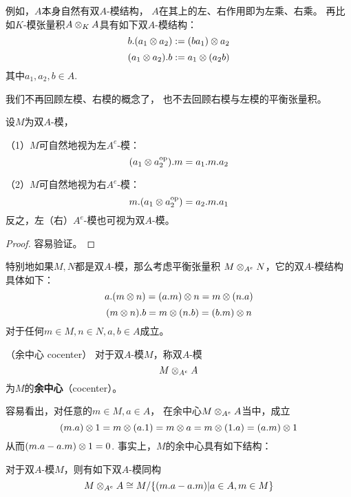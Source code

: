 例如，$A$本身自然有双$A$-模结构，
$A$在其上的左、右作用即为左乘、右乘。
再比如$K$-模张量积$A\otimes_KA$具有如下双$A$-模结构：
$$b.(a_1\otimes a_2):=(ba_1)\otimes a_2$$
$$(a_1\otimes a_2).b:=a_1\otimes(a_2b)$$
其中$a_1,a_2,b\in A$.

我们不再回顾左模、右模的概念了，
也不去回顾右模与左模的平衡张量积。

\begin{prop}设$M$为双$A$-模，

（1）$M$可自然地视为左$A^e$-模：
$$(a_1\otimes a_2^{\text{op}}).m=a_1.m.a_2$$

（2）$M$可自然地视为右$A^e$-模：
$$m.(a_1\otimes a_2^{\text{op}})=a_2.m.a_1$$
反之，左（右）$A^e$-模也可视为双$A$-模。
\end{prop}

\begin{proof}
容易验证。
\end{proof}

特别地如果$M,N$都是双$A$-模，那么考虑平衡张量积
$M\otimes_{A^e}N$，它的双$A$-模结构具体如下：
$$a.(m\otimes n)=(a.m)\otimes n=m\otimes(n.a)$$
$$(m\otimes n).b=m\otimes (n.b)=(b.m)\otimes n$$
对于任何$m\in M,n\in N,a,b\in A$成立。

\begin{definition}（余中心 cocenter）
对于双$A$-模$M$，称双$A$-模
$$M\otimes_{A^e}A$$
为$M$的\textbf{余中心}（cocenter）。
\end{definition}

容易看出，对任意的$m\in M,a\in A$，
在余中心$M\otimes_{A^e}A$当中，成立
$$(m.a)\otimes 1=m\otimes(a.1)=m\otimes a=m\otimes(1.a)=(a.m)\otimes 1$$
从而$(m.a-a.m)\otimes 1=0$.
事实上，$M$的余中心具有如下结构：

\begin{prop}
对于双$A$-模$M$，则有如下双$A$-模同构
$$M\otimes_{A^e}A\cong M/\{(m.a-a.m)|a\in A,m\in M\}$$
\label{双模的余中心的结构prop}
\end{prop}

